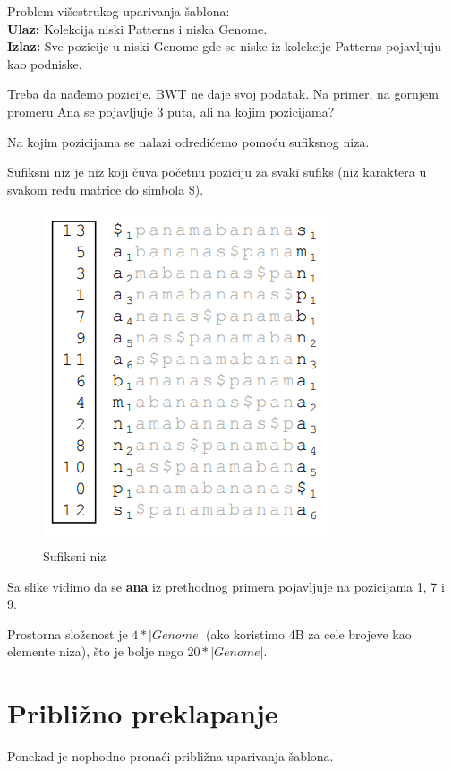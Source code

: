 Problem višestrukog uparivanja šablona:\\
\textbf{Ulaz:} Kolekcija niski Patterns i niska Genome.\\
\textbf{Izlaz:} Sve pozicije u niski Genome gde se niske iz kolekcije Patterns pojavljuju kao podniske.

Treba da nađemo pozicije. BWT ne daje svoj podatak. Na primer, na gornjem promeru Ana se pojavljuje 3 puta, ali na kojim pozicijama?

Na kojim pozicijama se nalazi odredićemo pomoću sufiksnog niza.

Sufiksni niz je niz koji čuva početnu poziciju za svaki sufiks (niz karaktera u svakom redu matrice do simbola \$).


\begin{figure}[h!]
\centering
\includegraphics[scale=0.75]{poglavlja/9/slike/sufiksniNiz.png}
\caption{Sufiksni niz}
\label{slika:X}
\end{figure}

\newpage

Sa slike vidimo da se \textbf{ana} iz prethodnog primera pojavljuje na pozicijama 1, 7 i 9.

Prostorna složenost je $4 * |Genome|$ (ako koristimo 4B za cele brojeve kao elemente niza), što je bolje nego $20 * |Genome|$.

\section{Približno preklapanje}

Ponekad je nophodno pronaći približna uparivanja šablona.

